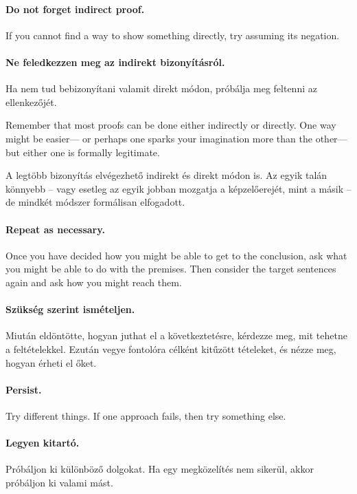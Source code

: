 \paragraph{Do not forget indirect proof.}
If you cannot find a way to show something directly, try assuming its negation.

\paragraph{Ne feledkezzen meg az indirekt bizonyításról.}
Ha nem tud bebizonyítani valamit direkt módon, próbálja meg feltenni az ellenkezőjét.

Remember that most proofs can be done either indirectly or directly. One way might be easier--- or perhaps one sparks your imagination more than the other--- but either one is formally legitimate.

A legtöbb bizonyítás elvégezhető indirekt és direkt módon is. Az egyik talán könnyebb -- vagy esetleg az egyik jobban mozgatja a képzelőerejét, mint a másik -- de mindkét módszer formálisan elfogadott.

\paragraph{Repeat as necessary.} Once you have decided how you might be able to get to the conclusion, ask what you might be able to do with the premises. Then consider the target sentences again and ask how you might reach them.

\paragraph{Szükség szerint ismételjen.} Miután eldöntötte, hogyan juthat el a következtetésre, kérdezze meg, mit tehetne a feltételekkel. Ezután vegye fontolóra célként kitűzött tételeket, és nézze meg, hogyan érheti el őket.

\paragraph{Persist.}
Try different things. If one approach fails, then try something else.

\paragraph{Legyen kitartó.}
Próbáljon ki különböző dolgokat. Ha egy megközelítés nem sikerül, akkor próbáljon ki valami mást.

